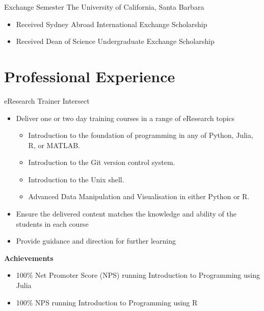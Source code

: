 {Exchange Semester}
{The University of California, Santa Barbara}{}{}
{%
\begin{itemize}
  \item Received Sydney Abroad International Exchange Scholarship
  \item Received Dean of Science Undergraduate Exchange Scholarship
\end{itemize}
}

\nocite{*}
\printbibliography[title={Selected Publications}]

\pagebreak
\section{Professional Experience}

{eResearch Trainer}
{Intersect}{}{}
{%
  \begin{itemize}
    \item Deliver one or two day training courses in a range of eResearch topics
      \begin{itemize}
        \item Introduction to the foundation of programming in any of Python, Julia, R, or MATLAB.
        \item Introduction to the Git version control system.
        \item Introduction to the Unix shell.
        \item Advanced Data Manipulation and Visualisation in either Python or R.
      \end{itemize}
    \item Ensure the delivered content matches the knowledge and ability of the students in each
      course
    \item Provide guidance and direction for further learning
  \end{itemize}
  \textbf{Achievements}
  \begin{itemize}
    \item 100\% Net Promoter Score (NPS) running Introduction to Programming using Julia
    \item 100\% NPS running Introduction to Programming using R
  \end{itemize}
}

